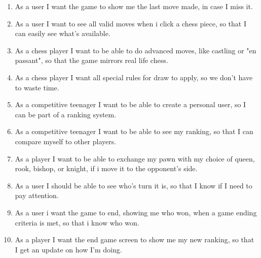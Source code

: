 \documentclass{article}
\begin{document}
\begin{enumerate}
\item	As a user I want the game to show me the last move made, in case I miss it.

\item 	As a user I want to see all valid moves when i click a chess piece, so that I can easily see what's available.   

\item 	As a chess player I want to be able to do advanced moves, like castling or "en passant", so that the game mirrors real life chess.

\item	As a chess player I want all special rules for draw to apply, so we don't have to waste time. 

\item	As a competitive teenager I want to be able to create a personal user, so I can be part of a ranking system.

\item	As a competitive teenager I want to be able to see my ranking, so that I can compare myself to other players.

\item	As a player I want to be able to exchange my pawn with my choice of queen, rook, bishop, or knight, if i move it to the opponent's side. 

\item	As a user I should be able to see who's turn it is, so that I know if I need to pay attention.

\item	As a user i want the game to end, showing me who won, when a game ending criteria is met, so that i know who won.

\item	As a player I want the end game screen to show me my new ranking, so that I get an update on how I'm doing.

\end{enumerate}
\end{document}
